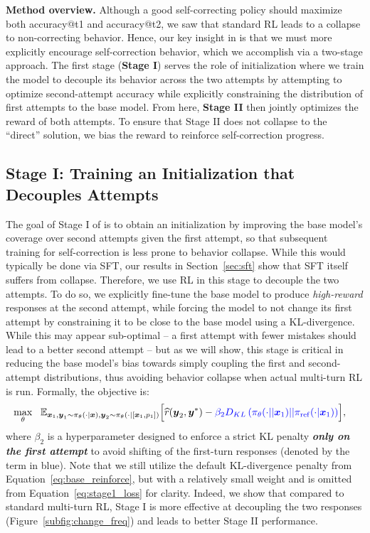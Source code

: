\textbf{Method overview.} Although a good self-correcting policy should maximize both accuracy@t1 and accuracy@t2, we saw that standard RL leads to a collapse to non-correcting behavior. Hence, our key insight in \methodname{} is that we must more explicitly encourage self-correction behavior, which we accomplish via a two-stage approach. The first stage (\textbf{Stage I}) serves the role of initialization where we train the model to decouple its behavior across the two attempts by attempting to optimize second-attempt accuracy while explicitly constraining the distribution of first attempts to the base model. From here, \textbf{Stage II} then jointly optimizes the reward of both attempts. To ensure that Stage II does not collapse to the ``direct'' solution, we bias the reward to reinforce self-correction progress. 

\vspace{-0.35cm}
\subsection{Stage I: Training an Initialization that Decouples Attempts}
\vspace{-0.25cm}
The goal of Stage I of \methodname{} is to obtain an initialization by improving the base model's coverage over second attempts given the first attempt, so that subsequent training for self-correction is less prone to behavior collapse. While this would typically be done via SFT, our results in Section~\ref{sec:sft} show that SFT itself suffers from collapse. Therefore, we use RL in this stage to decouple the two attempts.
To do so, we explicitly fine-tune the base model to produce \emph{high-reward} responses at the second attempt, while forcing the model to not change its first attempt by constraining it to be close to the base model using a KL-divergence. While this may appear sub-optimal -- a first attempt with fewer mistakes should lead to a better second attempt -- but as we will show, this stage is critical in reducing the base model's bias towards simply coupling the first and second-attempt distributions, thus avoiding behavior collapse when actual multi-turn RL is run. Formally, the objective is:
\begin{align}
    \label{eq:stage1_loss}
    \max_{\theta}~~ \mathbb{E}_{\boldsymbol{x}_1, \boldsymbol{y}_1 \sim \pi_{\theta}(\cdot | \boldsymbol{x}), \boldsymbol{y}_2 \sim \pi_\theta(\cdot|[\boldsymbol{x}_1, p_1]) }\Big[\widehat{r}(\boldsymbol{y}_2, \boldsymbol{y}^*) &- \textcolor{blue}{\beta_2 D_{KL}\left(\pi_{\theta}(\cdot || \boldsymbol{x}_1) || \pi_\mathrm{ref}(\cdot | \boldsymbol{x}_1)\right)} \Big],
\end{align}
where $\beta_2$ is a hyperparameter designed to enforce a strict KL penalty \emph{\textbf{only on the first attempt}} to avoid shifting of the first-turn responses (denoted by the term in blue). Note that we still utilize the default KL-divergence penalty from Equation~\ref{eq:base_reinforce}, but with a relatively small weight and is omitted from Equation~\ref{eq:stage1_loss} for clarity. Indeed, we show that compared to standard multi-turn RL, Stage I is more effective at decoupling the two responses (Figure~\ref{subfig:change_freq}) and leads to better Stage II performance.

